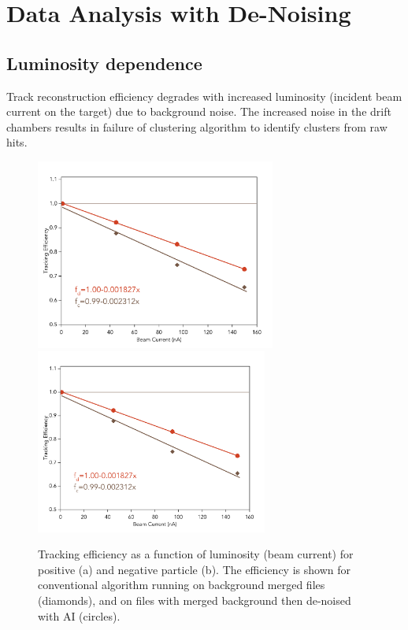 \section{Data Analysis with De-Noising}

\subsection{Luminosity dependence}

Track reconstruction efficiency degrades with increased luminosity (incident beam current on the target) due to background
noise. The increased noise in the drift chambers results in failure of clustering algorithm to identify clusters from raw hits. 

\begin{figure}[!ht]
\begin{center}
 \includegraphics[width=3.1in]{images/figure_lscan_pos.pdf}
 \includegraphics[width=3in]{images/figure_lscan_pos.pdf}
\caption {Tracking efficiency as a function of luminosity (beam current) for positive (a) and negative particle (b).  The efficiency is shown for
conventional algorithm running on background merged files (diamonds), and on files with merged background then de-noised with AI (circles).}
 \label{lscan::conv_dn}
 \end{center}
\end{figure}

